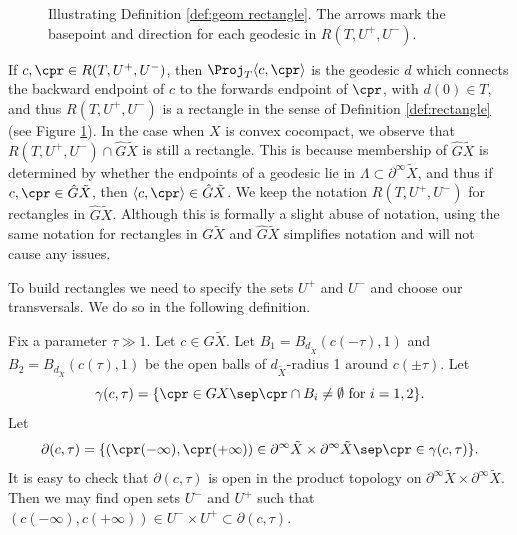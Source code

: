 \begin{figure}[htb]
\caption{Illustrating Definition \ref{def:geom rectangle}. The arrows mark the basepoint and direction for each geodesic in $R(T,U^+,U^-)$.}\label{fig:geom rectangle}
\end{figure}
If $c, \cpr \in R(T,U^+,U^-)$, then $\Proj_T \langle c, \cpr\rangle $ is the geodesic $d$ which connects the backward endpoint of $c$ to the forwards endpoint of $\cpr$, with $d(0)\in T$, and thus $R(T,U^+,U^-)$ is a rectangle in the sense of Definition \ref{def:rectangle} (see Figure \ref{fig:geom rectangle}). In the case when $X$ is convex cocompact, we observe that $R(T, U^+, U^-)\cap \hat G\tilde X$ is still a rectangle. This is because membership of $\hat G\tilde X$ is determined by whether the endpoints of a geodesic lie in $\Lambda \subset \partial^\infty\tilde X$, and thus if $c, \cpr\in \hat G\tilde X$, then $\langle c,\cpr\rangle \in \hat G\tilde X$. We keep the notation $R(T, U^+, U^-)$ for rectangles in $\hat G \tilde X$. Although this is formally a slight abuse of notation, using the same notation for rectangles in $G \tilde X$ and $\hat G \tilde X$ simplifies notation and will not cause any issues.

To build rectangles we need to specify the sets $U^+$ and $U^-$ and choose our transversals. We do so in the following definition.

Fix a parameter $\tau \gg 1$. Let $c\in G\tilde X$. Let $B_1 = B_{d_{\tilde X}}(c(-\tau),1)$ and $B_2 = B_{d_{\tilde X}}(c(\tau),1)$ be the open balls of $d_{\tilde X}$-radius 1 around $c(\pm\tau)$. Let
\[ \gamma(c, \tau) = \{ \cpr\in GX \sep \cpr \cap B_i \neq \emptyset \mbox{ for } i=1,2 \}. \]
Let
\[ \partial (c, \tau) = \{ (\cpr(-\infty), \cpr(+\infty)) \in \partial^\infty \tilde X \times \partial^\infty \tilde X \sep \cpr\in \gamma(c,\tau) \}.\]
It is easy to check that $\partial (c, \tau)$ is open in the product topology on $\partial^\infty \tilde X \times \partial^\infty \tilde X$. Then we may find open sets $U^-$ and $U^+$ such that $(c(-\infty), c(+\infty)) \in U^- \times U^+ \subset \partial (c, \tau)$.

